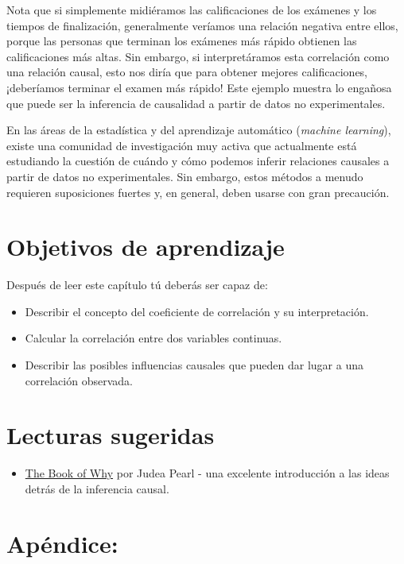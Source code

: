 \documentclass[
  12pt,
]{book}
\providecommand{\tightlist}{%
  \setlength{\itemsep}{0pt}\setlength{\parskip}{0pt}}
\begin{document}
Nota que si simplemente midiéramos las calificaciones de los exámenes y los tiempos de finalización, generalmente veríamos una relación negativa entre ellos, porque las personas que terminan los exámenes más rápido obtienen las calificaciones más altas. Sin embargo, si interpretáramos esta correlación como una relación causal, esto nos diría que para obtener mejores calificaciones, ¡deberíamos terminar el examen más rápido! Este ejemplo muestra lo engañosa que puede ser la inferencia de causalidad a partir de datos no experimentales.

En las áreas de la estadística y del aprendizaje automático (\emph{machine learning}), existe una comunidad de investigación muy activa que actualmente está estudiando la cuestión de cuándo y cómo podemos inferir relaciones causales a partir de datos no experimentales. Sin embargo, estos métodos a menudo requieren suposiciones fuertes y, en general, deben usarse con gran precaución.

\hypertarget{objetivos-de-aprendizaje-12}{%
\section{Objetivos de aprendizaje}\label{objetivos-de-aprendizaje-12}}

Después de leer este capítulo tú deberás ser capaz de:

\begin{itemize}
\tightlist
\item
  Describir el concepto del coeficiente de correlación y su interpretación.
\item
  Calcular la correlación entre dos variables continuas.
\item
  Describir las posibles influencias causales que pueden dar lugar a una correlación observada.
\end{itemize}

\hypertarget{lecturas-sugeridas-9}{%
\section{Lecturas sugeridas}\label{lecturas-sugeridas-9}}

\begin{itemize}
\tightlist
\item
  \href{http://bayes.cs.ucla.edu/WHY/}{The Book of Why} por Judea Pearl - una excelente introducción a las ideas detrás de la inferencia causal.
\end{itemize}

\hypertarget{apuxe9ndice-4}{%
\section{Apéndice:}\label{apuxe9ndice-4}}
\end{document}
